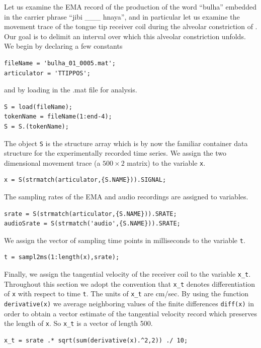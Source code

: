 \documentclass[a4paper, 12pt]{article}
\begin{document}
Let us examine the EMA record of the production of the word ``bulha'' embedded in the carrier phrase ``jibi \_\_\_ hnaya'', and in particular let us examine the movement trace of the tongue tip receiver coil during the alveolar constriction of . Our goal is to delimit an interval over which this alveolar constriction unfolds. We begin by declaring a few constants
\begin{verbatim}
fileName = 'bulha_01_0005.mat';
articulator = 'TTIPPOS';
\end{verbatim}
and by loading in the .mat file for analysis. 
\begin{verbatim}
S = load(fileName);
tokenName = fileName(1:end-4);
S = S.(tokenName);
\end{verbatim}
The object \texttt{S} is the structure array which is by now the familiar container data structure for the experimentally recorded time series. We assign the two dimensional movement trace (a $500\times 2$ matrix) to the variable \texttt{x}.
\begin{verbatim}
x = S(strmatch(articulator,{S.NAME})).SIGNAL;
\end{verbatim}
The sampling rates of the EMA and audio recordings are assigned to variables.
\begin{verbatim}
srate = S(strmatch(articulator,{S.NAME})).SRATE;
audioSrate = S(strmatch('audio',{S.NAME})).SRATE;
\end{verbatim}
We assign the vector of sampling time points in milliseconds to the variable \texttt{t}.
\begin{verbatim}
t = sampl2ms(1:length(x),srate);
\end{verbatim}
Finally, we assign the tangential velocity of the receiver coil to the variable \texttt{x\_t}. Throughout this section we adopt the convention that \texttt{x\_t} denotes differentiation of \texttt{x} with respect to time \texttt{t}. The units of \texttt{x\_t} are cm/sec. By using the function \texttt{derivative(x)} we average neighboring values of the finite differences \texttt{diff(x)} in order to obtain a vector estimate of the tangential velocity record which preserves the length of \texttt{x}. So \texttt{x\_t} is a vector of length 500.
\begin{verbatim}
x_t = srate .* sqrt(sum(derivative(x).^2,2)) ./ 10;
\end{verbatim}
\end{document}
